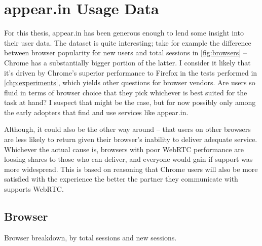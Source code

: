 \chapter{appear.in Usage Data}\label{chp:appear.in-usage}

For this thesis, appear.in has been generous enough to lend some insight into their user data. The dataset is quite interesting; take for example the difference between browser popularity for new users and total sessions in \autoref{fig:browsers} -- Chrome has a substantially bigger portion of the latter. I consider it likely that it's driven by Chrome's superior performance to Firefox in the tests performed in \autoref{chp:experiments}, which yields other questions for browser vendors. Are users so fluid in terms of browser choice that they pick whichever is best suited for the task at hand? I suspect that might be the case, but for now possibly only among the early adopters that find and use services like appear.in.

Although, it could also be the other way around -- that users on other browsers are less likely to return given their browser's inability to deliver adequate service. Whichever the actual cause is, browsers with poor WebRTC performance are loosing shares to those who can deliver, and everyone would gain if support was more widespread. This is based on reasoning that Chrome users will also be more satisfied with the experience the better the partner they communicate with supports WebRTC.


\section{Browser}

Browser breakdown, by total sessions and new sessions.

